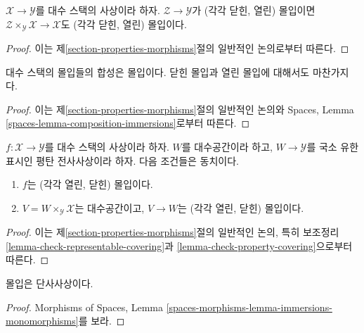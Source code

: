 \begin{lemma}
\label{lemma-base-change-immersion}
$\mathcal{X} \to \mathcal{Y}$를 대수 스택의 사상이라 하자.
$\mathcal{Z} \to \mathcal{Y}$가 (각각 닫힌, 열린) 몰입이면
$\mathcal{Z} \times_\mathcal{Y} \mathcal{X} \to \mathcal{X}$도
(각각 닫힌, 열린) 몰입이다.
\end{lemma}

\begin{proof}
이는 제\ref{section-properties-morphisms}절의 일반적인 논의로부터 따른다.
\end{proof}

\begin{lemma}
\label{lemma-composition-immersion}
대수 스택의 몰입들의 합성은 몰입이다.
닫힌 몰입과 열린 몰입에 대해서도 마찬가지다.
\end{lemma}

\begin{proof}
이는 제\ref{section-properties-morphisms}절의 일반적인 논의와
Spaces, Lemma \ref{spaces-lemma-composition-immersions}로부터 따른다.
\end{proof}

\begin{lemma}
\label{lemma-check-immersion-covering}
$f : \mathcal{X} \to \mathcal{Y}$를 대수 스택의 사상이라 하자.
$W$를 대수공간이라 하고, $W \to \mathcal{Y}$를 국소 유한 표시인
평탄 전사사상이라 하자. 다음 조건들은 동치이다.
\begin{enumerate}
\item $f$는 (각각 열린, 닫힌) 몰입이다.
\item $V = W \times_\mathcal{Y} \mathcal{X}$는 대수공간이고,
$V \to W$는 (각각 열린, 닫힌) 몰입이다.
\end{enumerate}
\end{lemma}

\begin{proof}
이는 제\ref{section-properties-morphisms}절의 일반적인 논의,
특히 보조정리 \ref{lemma-check-representable-covering}과
\ref{lemma-check-property-covering}으로부터 따른다.
\end{proof}

\begin{lemma}
\label{lemma-immersion-monomorphism}
몰입은 단사사상이다.
\end{lemma}

\begin{proof}
Morphisms of Spaces,
Lemma \ref{spaces-morphisms-lemma-immersions-monomorphisms}를 보라.
\end{proof}

